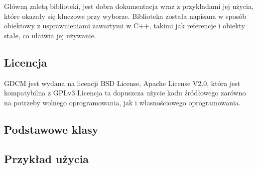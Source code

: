 \par
Główną zaletą biblioteki, jest dobra dokumentacja wraz z przykładami jej użycia, które okazały się kluczowe przy wyborze.
Biblioteka została napisana w sposób obiektowy z usprawnieniami zawartymi w C++, takimi jak referencje i obiekty stałe, co ułatwia jej używanie.

\subsection{Licencja}

\par 
GDCM jest wydana na licencji BSD License, Apache License V2.0, która jest kompatybilna z GPLv3
Licencja ta dopuszcza użycie kodu źródłowego zarówno na potrzeby wolnego oprogramowania, jak i własnościowego oprogramowania.


\subsection{Podstawowe klasy}
\label{sec:gdcm-classes}


\subsection{Przykład użycia}
\label{sec:gdcm-use}
